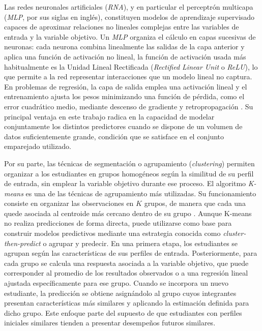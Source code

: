 Las redes neuronales artificiales (\textit{RNA}), y en particular el perceptrón multicapa (\textit{MLP}, por sus siglas en inglés), constituyen modelos de aprendizaje supervisado capaces de aproximar relaciones no lineales complejas entre las variables de entrada y la variable objetivo. Un \textit{MLP} organiza el cálculo en capas sucesivas de neuronas: cada neurona combina linealmente las salidas de la capa anterior y aplica una función de activación no lineal, la función de activación usada más habitualmente es la Unidad Lineal Rectificada (\textit{Rectified Linear Unit} o \textit{ReLU}), lo que permite a la red representar interacciones que un modelo lineal no captura. En problemas de regresión, la capa de salida emplea una activación lineal y el entrenamiento ajusta los pesos minimizando una función de pérdida, como el error cuadrático medio, mediante descenso de gradiente y retropropagación \cite{goodfellow2016deep}. Su principal ventaja en este trabajo radica en la capacidad de modelar conjuntamente los distintos predictores cuando se dispone de un volumen de datos suficientemente grande, condición que se satisface en el conjunto emparejado utilizado.

Por su parte, las técnicas de segmentación o agrupamiento (\textit{clustering}) permiten organizar a los estudiantes en grupos homogéneos según la similitud de su perfil de entrada, sin emplear la variable objetivo durante ese proceso. El algoritmo \textit{K-means} es una de las técnicas de agrupamiento más utilizadas. Su funcionamiento consiste en organizar las observaciones en $K$ grupos, de manera que cada una quede asociada al centroide más cercano dentro de su grupo \cite{mcqueen1967some}. Aunque K-means no realiza predicciones de forma directa, puede utilizarse como base para construir modelos predictivos mediante una estrategia conocida como \textit{cluster-then-predict} o agrupar y predecir. En una primera etapa, los estudiantes se agrupan según las características de sus perfiles de entrada. Posteriormente, para cada grupo se calcula una respuesta asociada a la variable objetivo, que puede corresponder al promedio de los resultados observados o a una regresión lineal ajustada específicamente para ese grupo. Cuando se incorpora un nuevo estudiante, la predicción se obtiene asignándolo al grupo cuyos integrantes presentan características más similares y aplicando la estimación definida para dicho grupo. Este enfoque parte del supuesto de que estudiantes con perfiles iniciales similares tienden a presentar desempeños futuros similares.

